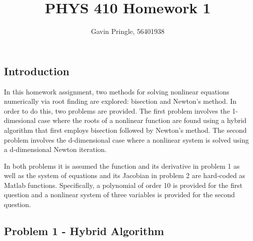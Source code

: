 \documentclass[10pt]{article}
\title{PHYS 410 Homework 1}
\author{Gavin Pringle, 56401938}
\begin{document}
\maketitle


\subsection*{Introduction}
In this homework assignment, two methods for solving nonlinear equations numerically via root finding 
are explored: bisection and Newton's method. In order to do this, two problems are provided. The first 
problem involves the 1-dimesional case where the roots of a nonlinear function are found using a hybrid 
algorithm that first employs bisection followed by Newton's method. The second problem involves the 
d-dimensional case where a nonlinear system is solved using a d-dimensional Newton iteration. 

In both problems it is assumed the function and its derivative in problem 1 as well as the system of 
equations and its Jacobian in problem 2 are hard-coded as Matlab functions. Specifically, a polynomial
of order 10 is provided for the first question and a nonlinear system of three variables is provided 
for the second question. 

\pagebreak

\subsection*{Problem 1 - Hybrid Algorithm}
\end{document}
